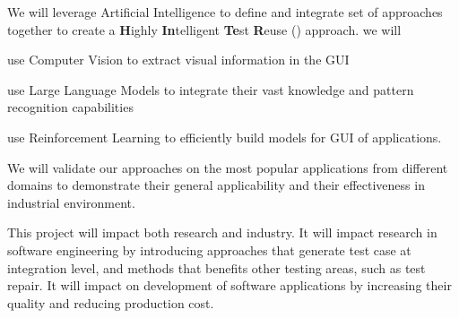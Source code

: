 
We will leverage Artificial Intelligence to define  and integrate set of \testreuse approaches together to create a  \textbf{H}ighly \textbf{In}telligent \textbf{Te}st \textbf{R}euse (\project) approach.
we will
\begin{inparaenum}[(i)]
\item use Computer Vision to extract visual information in the GUI
\item  use Large Language Models to integrate their vast knowledge and pattern recognition capabilities
\item use Reinforcement Learning to efficiently build models for  GUI of applications.
\end{inparaenum}
We will validate our approaches on the most popular applications from different domains to demonstrate their general applicability and  their effectiveness in industrial environment.



This project will impact both research and industry. 
It will impact research in software engineering by introducing approaches that generate test case at integration level, and methods that benefits other testing areas, such as test repair. 
It will impact on development of software applications by increasing their quality and reducing production cost.




























